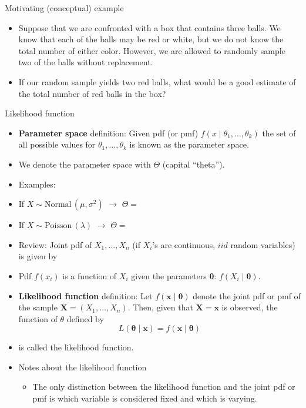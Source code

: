 \documentclass{article}
\newcommand{\vecn}[2]{#1_1, \ldots, #1_{#2}}	%
\newcommand{\follow}[1]{\sim \text{#1}\,}		%
\begin{document}
Motivating (conceptual) example\bigskip\
\begin{itemize}
    \item Suppose that we are confronted with a box that contains three balls. We know that each of the balls may be red or white, but we do not know the total number of either color. However, we are allowed to randomly sample two of the balls without replacement.
    \item If our random sample yields two red balls, what would be a good estimate of the total number of red balls in the box?\vspace{120pt}
\end{itemize}\bigskip

Likelihood function\bigskip
\begin{itemize}
    \item \textbf{Parameter space} definition: Given pdf (or pmf) $f(x \mid \theta_1, \ldots, \theta_k)$ the set of all possible values for $\theta_1, \ldots, \theta_k$ is known as the parameter space.
    \item[] We denote the parameter space with $\Theta$ (capital ``theta'').
    \item Examples:
    \item[] If $X \follow{Normal}(\mu, \sigma^2)$ $\rightarrow$ $\Theta = $
    \item[] If $X \follow{Poisson}(\lambda)$ $\rightarrow$ $\Theta = $\bigskip
    \item Review: Joint pdf of $\vecn{X}{n}$ (if $X_i$'s are continuous, $iid$ random variables) is given by\vspace{20pt}
    \item[] Pdf $f(x_i)$ is a function of $X_i$ given the parameters $\boldsymbol{\theta}$: $f(X_i \mid \boldsymbol{\theta})$.\bigskip
    \item \textbf{Likelihood function} definition: Let $f(\mathbf{x} \mid \boldsymbol{\theta})$ denote the joint pdf or pmf of the sample $\boldsymbol{X} = (\vecn{X}{n})$. Then, given that $\mathbf{X} = \mathbf{x}$ is observed, the function of $\theta$ defined by 
    \[L(\boldsymbol{\theta} \mid \mathbf{x}) = f(\mathbf{x} \mid \boldsymbol{\theta})\]
    \item[] is called the likelihood function.\bigskip
    \item Notes about the likelihood function
    \begin{itemize}
        \item The only distinction between the likelihood function and the joint pdf or pmf is which variable is considered fixed and which is varying.

\end{itemize}
\end{itemize}
\end{document}
